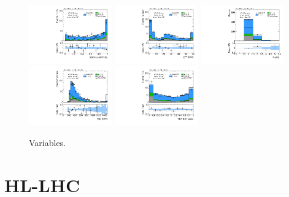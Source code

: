 \begin{figure}[tp]
  \includegraphics[width=0.32\textwidth]{figures/vbf-LTT/lep-eta-centrality}
  \includegraphics[width=0.32\textwidth]{figures/vbf-LTT/system-pt}
  \includegraphics[width=0.32\textwidth]{figures/vbf-LTT/n-jets30}
  \includegraphics[width=0.32\textwidth]{figures/vbf-LTT/dijet-m-high}
  \includegraphics[width=0.32\textwidth]{figures/vbf-LTT/BDTEve-VBF}
  \caption{Variables.}
  \label{fig:prospects-ltt-jets}
\end{figure}

\section{HL-LHC}
\label{sec:prospects-hllhc}

